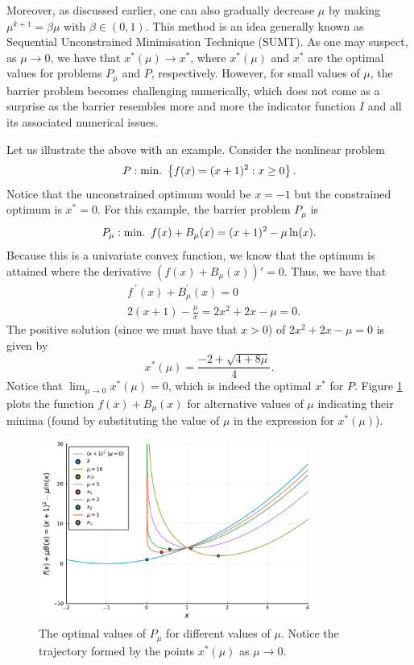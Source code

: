 Moreover, as discussed earlier, one can also gradually decrease $\mu$ by making $\mu^{k+1} = \beta\mu$ with $\beta \in (0,1)$. This method is an idea generally known as Sequential Unconstrained Minimisation Technique (SUMT). As one may suspect, as $\mu \rightarrow 0$, we have that $x^*(\mu) \rightarrow x^*$, where $x^*(\mu)$ and $x^*$ are the optimal values for problems $P_\mu$ and $P$, respectively. However, for small values of $\mu$, the barrier problem becomes challenging numerically, which does not come as a surprise as the barrier resembles more and more the indicator function $I$ and all its associated numerical issues. 

Let us illustrate the above with an example. Consider the nonlinear problem 
	$$
	P : \mathop{\text{min.~}} \left\{ f(x) = (x + 1)^2 : x \geq 0 \right \}.
	$$ 
	Notice that the unconstrained optimum would be $x =-1$ but the constrained optimum is $x^* = 0$. For this example, the barrier problem $P_\mu$ is
	$$P_\mu : \mathop{\text{min.~}} f(x) + B_\mu(x) = (x + 1)^2 - \mu \ln(x).$$
	Because this is a univariate convex function, we know that the optimum is attained where the derivative $(f(x) + B_\mu(x))' = 0$. Thus, we have that
	\begin{align*}
		& f^{~\prime}(x) + B_\mu^\prime(x) = 0 \\
		& 2(x+1) - \frac{\mu}{x} = 2x^2 + 2x -\mu = 0.
	\end{align*}
	The positive solution (since we must have that $x > 0$) of $2x^2 + 2x -\mu = 0$ is given by
	$$ x^*(\mu) = \frac{-2 + \sqrt{4 + 8\mu}}{4}.  
	$$ 
	Notice that $\lim_{\mu \rightarrow 0}x^*(\mu) = 0$, which is indeed the optimal $x^*$ for $P$. Figure \ref{p1c7:fig:example-barrier} plots the function $f(x) + B_\mu(x)$ for alternative values of $\mu$ indicating their minima (found by substituting the value of $\mu$ in the expression for $x^*(\mu)$). 

\begin{figure}
	\includegraphics[width=0.8\textwidth]{chapters/chapter_7/figures/ex-barrier.pdf}
	\caption{The optimal values of $P_\mu$ for different values of $\mu$. Notice the trajectory formed by the points $x^*(\mu)$ as $\mu \to 0$.} \label{p1c7:fig:example-barrier} 	
\end{figure}


